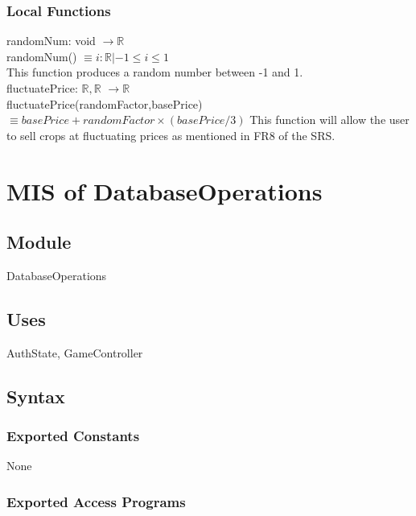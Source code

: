 \documentclass[12pt, titlepage]{article}
\begin{document}
\subsubsection{Local Functions}

randomNum: void $\rightarrow \mathbb{R}$  \\
randomNum() $\equiv i : \mathbb{R} | - 1 \le i \le 1 $ \\
This function produces a random number between -1 and 1. \\
fluctuatePrice: $\mathbb{R}, \mathbb{R}$  $\rightarrow \mathbb{R}$\\
fluctuatePrice(randomFactor,basePrice) $\equiv basePrice + randomFactor
\times (basePrice/3) $
This function will allow the user to sell crops at fluctuating prices as mentioned in FR8 of the SRS.


\medskip
\newpage
\section{MIS of DatabaseOperations} 


\subsection{Module}
DatabaseOperations

\subsection{Uses}
AuthState, GameController

\subsection{Syntax}

\subsubsection{Exported Constants}
None

\subsubsection{Exported Access Programs}
\end{document}
